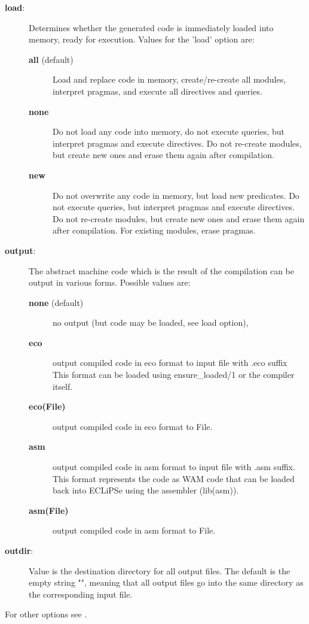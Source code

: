 \begin{description}
\item[{\bf load}:]
    Determines whether the generated code is immediately loaded into memory,
    ready for execution.  Values for the 'load' option are:
    \begin{description}
    \item[{\bf all} (default)]
        Load and replace code in memory, create/re-create all modules,
	interpret pragmas, and execute all directives and queries.
    \item[{\bf none}]
        Do not load any code into memory, do not execute queries,
	but interpret pragmas and execute directives.
        Do not re-create modules, but create new ones and erase them
        again after compilation.
    \item[{\bf new}]
        Do not overwrite any code in memory, but load new predicates.
        Do not execute queries, but interpret pragmas and execute directives.
        Do not re-create modules, but create new ones and erase them
        again after compilation. For existing modules, erase pragmas.
    \end{description}

\item[{\bf output}:]
    The abstract machine code which is the result of the compilation can
    be output in various forms.  Possible values are:
    \begin{description}
    \item[{\bf none} (default)]
        no output (but code may be loaded, see load option),
    \item[{\bf eco}]
        output compiled code in eco format to input file with .eco suffix
        This format can be loaded using ensure_loaded/1 or the compiler
        itself.
    \item[{\bf eco(File)}]
        output compiled code in eco format to File.
    \item[{\bf asm}]
        output compiled code in asm format to input file with .asm suffix.
        This format represents the code as WAM code that can be loaded back
        into ECLiPSe using the assembler (lib(asm)).  
    \item[{\bf asm(File)}]
        output compiled code in asm format to File.
    \end{description}

\item[{\bf outdir}:]
    Value is the destination directory for all output files.
    The default is the empty string "", meaning that all output files
    go into the same directory as the corresponding input file.
\end{description}
For other options see
.

